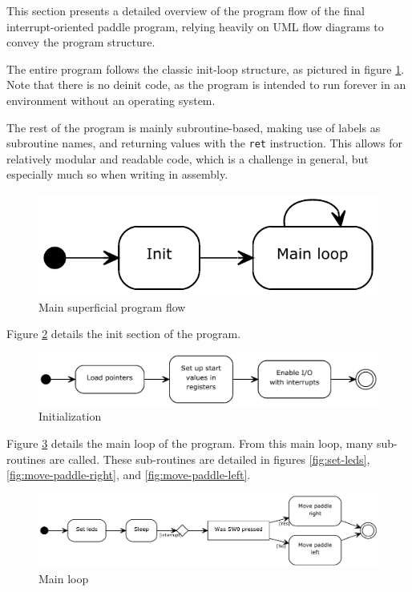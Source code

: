 This section presents a detailed overview of the program flow of the final interrupt-oriented paddle program, relying heavily on UML flow diagrams to convey the program structure.

The entire program follows the classic init-loop structure, as pictured in figure \ref{fig:main-program-flow}. Note that there is no deinit code, as the program is intended to run forever in an environment without an operating system.

The rest of the program is mainly subroutine-based, making use of labels as subroutine names, and returning values with the \texttt{ret} instruction. This allows for relatively modular and readable code, which is a challenge in general, but especially much so when writing in assembly.

\begin{figure}
\includegraphics[width = \textwidth]{description-and-methodology/program-flow/main-program-flow.pdf}
\caption{Main superficial program flow}
\label{fig:main-program-flow}
\end{figure}

Figure \ref{fig:init} details the init section of the program.

\begin{figure}
\includegraphics[width = \textwidth]{description-and-methodology/program-flow/init.pdf}
\caption{Initialization}
\label{fig:init}
\end{figure}

Figure \ref{fig:main-loop} details the main loop of the program. From this main loop, many sub-routines are called. These sub-routines are detailed in figures \ref{fig:set-leds}, \ref{fig:move-paddle-right}, and \ref{fig:move-paddle-left}.

\begin{figure}
\includegraphics[width = \textwidth]{description-and-methodology/program-flow/main-loop.pdf}
\caption{Main loop}
\label{fig:main-loop}
\end{figure}

